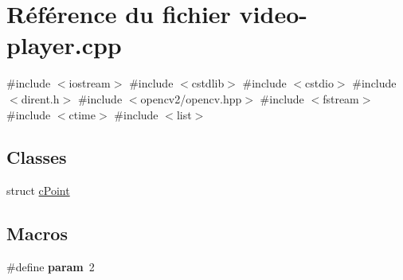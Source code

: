 \hypertarget{video-player_8cpp}{}\section{Référence du fichier video-\/player.cpp}
\label{video-player_8cpp}
{\ttfamily \#include $<$iostream$>$}\newline
{\ttfamily \#include $<$cstdlib$>$}\newline
{\ttfamily \#include $<$cstdio$>$}\newline
{\ttfamily \#include $<$dirent.\+h$>$}\newline
{\ttfamily \#include $<$opencv2/opencv.\+hpp$>$}\newline
{\ttfamily \#include $<$fstream$>$}\newline
{\ttfamily \#include $<$ctime$>$}\newline
{\ttfamily \#include $<$list$>$}\newline
\subsection*{Classes}
\begin{DoxyCompactItemize}
\item 
struct \hyperlink{structcPoint}{c\+Point}
\end{DoxyCompactItemize}
\subsection*{Macros}
\begin{DoxyCompactItemize}
\item 
\mbox{\label{video-player_8cpp_acff701cfc8fab0de8704435ba1462970}} 
\#define {\bfseries param}~2
\end{DoxyCompactItemize}
